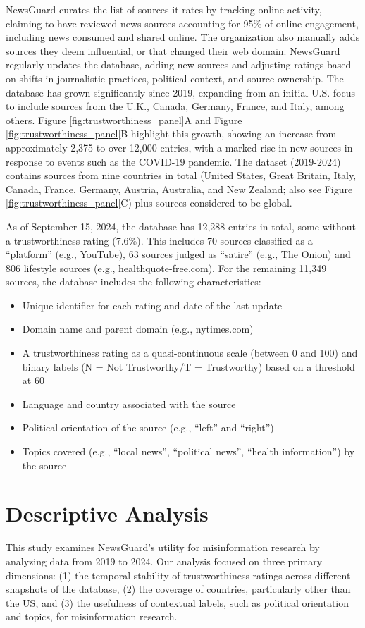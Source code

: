 \documentclass{article}
\begin{document}
NewsGuard curates the list of sources it rates by tracking online activity, claiming to have reviewed news sources accounting for 95\% of online engagement, including news consumed and shared online.
The organization also manually adds sources they deem influential, or that changed their web domain.
NewsGuard regularly updates the database, adding new sources and adjusting ratings based on shifts in journalistic practices, political context, and source ownership.
The database has grown significantly since 2019, expanding from an initial U.S. focus to include sources from the U.K., Canada, Germany, France, and Italy, among others. 
Figure \ref{fig:trustworthiness_panel}A and Figure \ref{fig:trustworthiness_panel}B highlight this growth, showing an increase from approximately 2,375 to over 12,000 entries, with a marked rise in new sources in response to events such as the COVID-19 pandemic. 
The dataset (2019-2024) contains sources from nine countries in total (United States, Great Britain, Italy, Canada, France, Germany, Austria, Australia, and New Zealand; also see Figure \ref{fig:trustworthiness_panel}C) plus sources considered to be global.

As of September 15, 2024, the database has 12,288 entries in total, some without a trustworthiness rating (7.6\%). 
This includes 70 sources classified as a ``platform'' (e.g., YouTube), 63 sources judged as ``satire'' (e.g., The Onion) and 806 lifestyle sources (e.g., healthquote-free.com). 
For the remaining 11,349 sources, the database includes the following characteristics:
\begin{itemize}
    \item Unique identifier for each rating and date of the last update
    \item Domain name and parent domain (e.g., nytimes.com)
    \item A trustworthiness rating as a quasi-continuous scale (between 0 and 100) and binary labels (N = Not Trustworthy/T = Trustworthy) based on a threshold at 60
    \item Language and country associated with the source
    \item Political orientation of the source (e.g., ``left'' and ``right'')
    \item Topics covered (e.g., ``local news'', ``political news'', ``health information'') by the source
\end{itemize}


\section{Descriptive Analysis}
This study examines NewsGuard’s utility for misinformation research by analyzing data from 2019 to 2024. 
Our analysis focused on three primary dimensions: (1) the temporal stability of trustworthiness ratings across different snapshots of the database, (2) the coverage of countries, particularly other than the US, and (3) the usefulness of contextual labels, such as political orientation and topics, for misinformation research.
\end{document}
